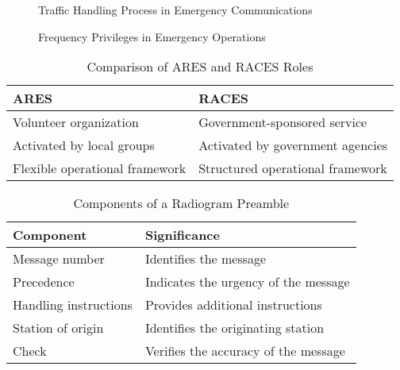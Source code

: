 \begin{figure}[h!]
    \centering
    \caption{Traffic Handling Process in Emergency Communications}
    \label{fig:traffic-handling-flow}
\end{figure}

\begin{figure}[h!]
    \centering
    \caption{Frequency Privileges in Emergency Operations}
    \label{fig:frequency-privileges}
\end{figure}

\begin{table}[h!]
    \centering
    \begin{tabular}{|l|l|}
        \hline
        \textbf{ARES} & \textbf{RACES} \\
        \hline
        Volunteer organization & Government-sponsored service \\
        Activated by local groups & Activated by government agencies \\
        Flexible operational framework & Structured operational framework \\
        \hline
    \end{tabular}
    \caption{Comparison of ARES and RACES Roles}
    \label{tab:ares-races-comparison}
\end{table}

\begin{table}[h!]
    \centering
    \begin{tabular}{|l|l|}
        \hline
        \textbf{Component} & \textbf{Significance} \\
        \hline
        Message number & Identifies the message \\
        Precedence & Indicates the urgency of the message \\
        Handling instructions & Provides additional instructions \\
        Station of origin & Identifies the originating station \\
        Check & Verifies the accuracy of the message \\
        \hline
    \end{tabular}
    \caption{Components of a Radiogram Preamble}
    \label{tab:radiogram-preamble}
\end{table}

